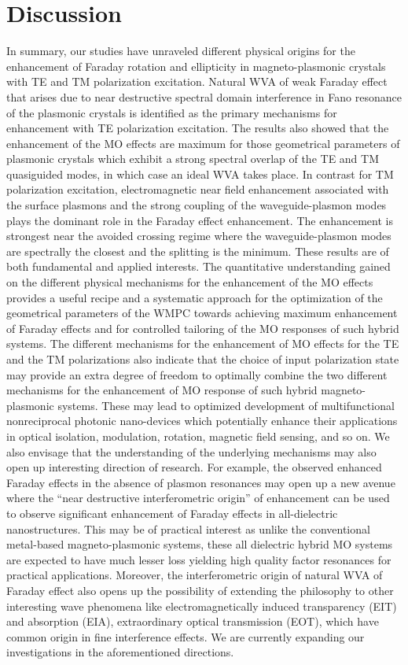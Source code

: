 \documentclass[13pt]{article}
\begin{document}
\section{Discussion}
\noindent
\par 
In summary, our studies have unraveled different physical origins for the enhancement of Faraday rotation and ellipticity in magneto-plasmonic crystals with TE and TM polarization excitation. Natural WVA of weak Faraday effect that arises due to near destructive spectral domain interference in Fano resonance of the plasmonic crystals is identified as the primary mechanisms for enhancement with TE polarization excitation. The results also showed that the enhancement of the MO effects are maximum for those geometrical parameters of plasmonic crystals which exhibit a strong spectral overlap of the TE and TM quasiguided modes, in which case an ideal WVA takes place. In contrast for TM polarization excitation, electromagnetic near field enhancement associated with the surface plasmons and the strong coupling of the waveguide-plasmon modes plays the dominant role in the Faraday effect enhancement. The enhancement is strongest near the avoided crossing regime where the waveguide-plasmon modes are spectrally the closest and the splitting is the minimum. These results are of both fundamental and applied interests. The quantitative understanding gained on the different physical mechanisms for the enhancement of the MO effects provides a useful recipe and a systematic approach for the optimization of the geometrical parameters of the WMPC towards achieving maximum enhancement of Faraday effects and for controlled tailoring of the MO responses of such hybrid systems. The different mechanisms for the enhancement of MO effects for the TE and the TM polarizations also indicate that the choice of input polarization state may provide an extra degree of freedom to optimally combine the two different mechanisms for the enhancement of MO response of such hybrid magneto-plasmonic systems. These may lead to optimized development of multifunctional nonreciprocal photonic nano-devices which potentially enhance their applications in optical isolation, modulation, rotation, magnetic field sensing, and so on. We also envisage that the understanding of the underlying mechanisms may also open up interesting direction of research. For example, the observed enhanced Faraday effects in the absence of plasmon resonances may open up a new avenue where the “near destructive interferometric origin” of enhancement can be used to observe significant enhancement of Faraday effects in all-dielectric nanostructures. This may be of practical interest as unlike the conventional metal-based magneto-plasmonic systems, these all dielectric hybrid MO systems are expected to have much lesser loss yielding high quality factor resonances for practical applications. Moreover, the interferometric origin of natural WVA of Faraday effect also opens up the possibility of extending the philosophy to other interesting wave phenomena like electromagnetically induced transparency (EIT) and absorption (EIA), extraordinary optical transmission (EOT), which have common origin in fine interference effects. We are currently expanding our investigations in the aforementioned directions.
\end{document}
